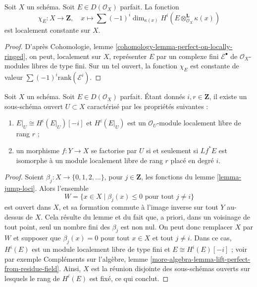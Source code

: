\begin{lemma}
\label{lemma-chi-locally-constant}
Soit $X$ un schéma. Soit $E \in D(\mathcal{O}_X)$ parfait.
La fonction
$$
\chi_E : X \longrightarrow \mathbf{Z},\quad
x \longmapsto \sum (-1)^i
\dim_{\kappa(x)} H^i(E \otimes_{\mathcal{O}_X}^\mathbf{L} \kappa(x))
$$
est localement constante sur $X$.
\end{lemma}

\begin{proof}
D'après Cohomologie, lemme
\ref{cohomology-lemma-perfect-on-locally-ringed},
on peut, localement sur $X$, représenter $E$ par un complexe fini
$\mathcal{E}^\bullet$ de $\mathcal{O}_X$-modules libres de type fini.
Sur un tel ouvert, la fonction $\chi_E$ est constante de valeur
$\sum (-1)^i \text{rank}(\mathcal{E}^i)$.
\end{proof}

\begin{lemma}
\label{lemma-open-where-cohomology-in-degree-i-rank-r}
Soit $X$ un schéma. Soit $E \in D(\mathcal{O}_X)$ parfait.
Étant donnés $i, r \in \mathbf{Z}$, il existe un
sous-schéma ouvert $U \subset X$ caractérisé par les propriétés suivantes :
\begin{enumerate}
\item $E|_U \cong H^i(E|_U)[-i]$ et $H^i(E|_U)$ est un
$\mathcal{O}_U$-module localement libre de rang $r$ ;
\item un morphisme $f : Y \to X$ se factorise par $U$ si et seulement si
$Lf^*E$ est isomorphe à un module localement libre de rang $r$
placé en degré $i$.
\end{enumerate}
\end{lemma}

\begin{proof}
Soient $\beta_j : X \to \{0, 1, 2, \ldots\}$, pour $j \in \mathbf{Z}$,
les fonctions du lemme \ref{lemma-jump-loci}. Alors l'ensemble
$$
W = \{x \in X \mid \beta_j(x) \leq 0\text{ pour tout }j \not = i\}
$$
est ouvert dans $X$, et sa formation commute à l'image inverse sur tout
$Y$ au-dessus de $X$. Cela résulte du lemme et du fait que,
a priori, dans un voisinage de tout point, seul un nombre fini
des $\beta_j$ est non nul. On peut donc remplacer $X$ par $W$
et supposer que $\beta_j(x) = 0$ pour tout $x \in X$ et tout $j \not = i$.
Dans ce cas, $H^i(E)$ est un module localement libre de type fini et
$E \cong H^i(E)[-i]$ ; voir par exemple
Compléments sur l'algèbre, lemme
\ref{more-algebra-lemma-lift-perfect-from-residue-field}.
Ainsi, $X$ est la réunion disjointe des sous-schémas ouverts sur lesquels le
rang de $H^i(E)$ est fixé, ce qui conclut.
\end{proof}

